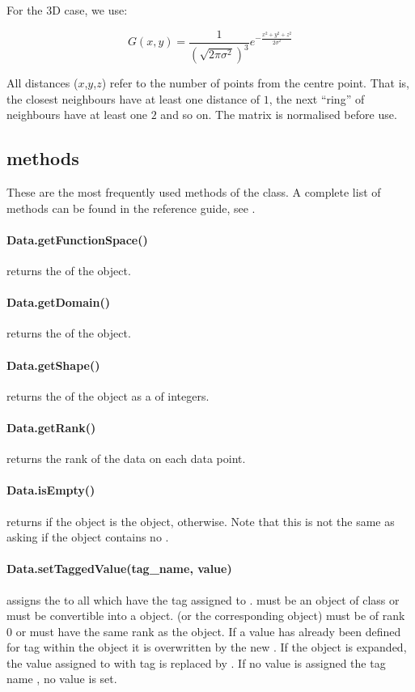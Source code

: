 \noindent For the 3D case, we use:

\[ G(x,y) = \frac{1}{(\sqrt{2\pi\sigma^2})^3} e^{-\frac{x^2+y^2+z^2}{2\sigma^2}} \]

All distances ($x$,$y$,$z$) refer to the number of points from the centre point.
That is, the closest neighbours have at least one distance of $1$, the next
``ring'' of neighbours have at least one $2$ and so on.
The matrix is normalised before use.

\subsection{\Data methods}
These are the most frequently used methods of the \Data class.
A complete list of methods can be found in the reference guide,
see \ReferenceGuide.

\paragraph{Data.getFunctionSpace()}
returns the \FunctionSpace of the object.


\paragraph{Data.getDomain()}
returns the \Domain of the object.


\paragraph{Data.getShape()}
returns the \Shape of the object as a  of integers.


\paragraph{Data.getRank()}
returns the rank of the data on each data point.


\paragraph{Data.isEmpty()}
returns \True if the \Data object is the \EmptyData object, \False otherwise.
Note that this is not the same as asking if the object contains no \DataSamplePoints.


\paragraph{Data.setTaggedValue(tag_name, value)}
assigns the  to all \DataSamplePoints which have the tag
assigned to .  must be an object of class
 or must be convertible into a  object.
 (or the corresponding  object) must be of
rank $0$ or must have the same rank as the object.
If a value has already been defined for tag  within the object
it is overwritten by the new . If the object is expanded,
the value assigned to \DataSamplePoints with tag  is replaced by
. If no value is assigned the tag name , no value is set.


